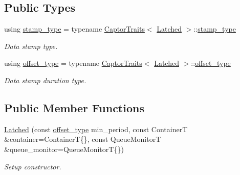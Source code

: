 \subsection*{Public Types}
\begin{DoxyCompactItemize}
\item 
\mbox{\label{classflow_1_1follower_1_1_latched_a330b7f9dd745cd2b513b21789250131d}} 
using \hyperlink{classflow_1_1follower_1_1_latched_a330b7f9dd745cd2b513b21789250131d}{stamp\+\_\+type} = typename \hyperlink{structflow_1_1_captor_traits}{Captor\+Traits}$<$ \hyperlink{classflow_1_1follower_1_1_latched}{Latched} $>$\+::\hyperlink{classflow_1_1follower_1_1_latched_a330b7f9dd745cd2b513b21789250131d}{stamp\+\_\+type}
\begin{DoxyCompactList}\small\item\em Data stamp type. \end{DoxyCompactList}\item 
\mbox{\label{classflow_1_1follower_1_1_latched_a437fa0b63a9d5c36c7a63774a53d6552}} 
using \hyperlink{classflow_1_1follower_1_1_latched_a437fa0b63a9d5c36c7a63774a53d6552}{offset\+\_\+type} = typename \hyperlink{structflow_1_1_captor_traits}{Captor\+Traits}$<$ \hyperlink{classflow_1_1follower_1_1_latched}{Latched} $>$\+::\hyperlink{classflow_1_1follower_1_1_latched_a437fa0b63a9d5c36c7a63774a53d6552}{offset\+\_\+type}
\begin{DoxyCompactList}\small\item\em Data stamp duration type. \end{DoxyCompactList}\end{DoxyCompactItemize}
\subsection*{Public Member Functions}
\begin{DoxyCompactItemize}
\item 
\hyperlink{classflow_1_1follower_1_1_latched_a5974d2c9a24b8ef6d9e1f71b696fafdb}{Latched} (const \hyperlink{classflow_1_1follower_1_1_latched_a437fa0b63a9d5c36c7a63774a53d6552}{offset\+\_\+type} min\+\_\+period, const ContainerT \&container=ContainerT\{\}, const Queue\+MonitorT \&queue\+\_\+monitor=Queue\+MonitorT\{\})
\begin{DoxyCompactList}\small\item\em Setup constructor. \end{DoxyCompactList}\end{DoxyCompactItemize}
